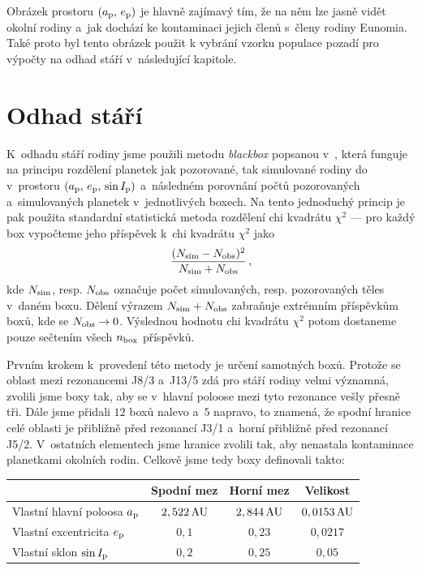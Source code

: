 \documentclass[A4paper, 12pt, oneside]{book}
\begin{document}
Obrázek prostoru $(a_{\rm p},\,e_{\rm p})$ je hlavně zajímavý tím, že na něm lze jasně vidět okolní rodiny a~jak dochází ke kontaminaci jejich členů s~členy rodiny Eunomia. Také proto byl tento obrázek použit k vybrání vzorku populace pozadí pro výpočty na odhad stáří v~následující kapitole.

\section{Odhad stáří}

K~odhadu stáří rodiny jsme použili metodu \textit{blackbox} popsanou v~\cite{broz19}, která funguje na principu rozdělení planetek jak pozorované, tak simulované rodiny do  v~prostoru $(a_{\rm p},\,e_{\rm p},\,\sin I_{\rm p})$ a~následném porovnání počtů pozorovaných a~simulovaných planetek v~jednotlivých boxech. Na tento jednoduchý princip je pak použita standardní statistická metoda rozdělení chi kvadrátu $\chi^2$ --- pro každý box vypočteme jeho příspěvek k~chi kvadrátu $\chi^2$ jako
\begin{align}
	\frac{(N_{\rm sim}-N_{\rm obs})^2}{N_{\rm sim}+N_{\rm obs}}\,,
\end{align}
kde $N_{\rm sim}$, resp. $N_{\rm obs}$ označuje počet simulovaných, resp. pozorovaných těles v~daném boxu. Dělení výrazem $N_{\rm sim}+N_{\rm obs}$ zabraňuje extrémním příspěvkům boxů, kde se $N_{\rm obs}\rightarrow 0$. Výslednou hodnotu chi kvadrátu $\chi^2$ potom dostaneme pouze sečtením všech $n_{\rm box}$ příspěvků.

Prvním krokem k~provedení této metody je určení samotných boxů. Protože se oblast mezi rezonancemi J8/3 a~J13/5 zdá pro stáří rodiny velmi významná, zvolili jsme boxy tak, aby se v~hlavní poloose mezi tyto rezonance vešly přesně tři. Dále jsme přidali $12$ boxů nalevo a~$5$ napravo, to znamená, že spodní hranice celé oblasti je přibližně před rezonancí J3/1 a~horní přibližně před rezonancí J5/2. V~ostatních elementech jsme hranice zvolili tak, aby nenastala kontaminace planetkami okolních rodin. Celkově jsme tedy boxy definovali takto:

\begin{center}
\begin{tabularx}{0.8\textwidth}{|X||c|c|c|}
	\hline
	& Spodní mez & Horní mez & Velikost  \\
	\hline \hline
	Vlastní hlavní poloosa $a_{\rm p}$ & $2,522\,{\rm AU}$ & $2,844\,{\rm AU}$ & $0,0153\,{\rm AU}$ \\
	\hline
	Vlastní excentricita $e_{\rm p}$ & $0,1$ & $0,23$ & $0,0217$ \\
	\hline
	Vlastní sklon $\sin I_{\rm p}$ & $0,2$ & $0,25$ & $0,05$ \\
	\hline
\end{tabularx}
\end{center}
\end{document}
